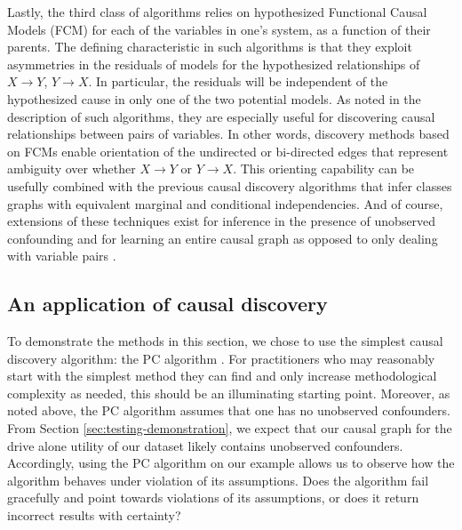Lastly, the third class of algorithms relies on hypothesized Functional Causal Models (FCM) \citep{goudet_2018_learning} for each of the variables in one's system, as a function of their parents.
The defining characteristic in such algorithms is that they exploit asymmetries in the residuals of models for the hypothesized relationships of $X \rightarrow Y$, $Y \rightarrow X$.
In particular, the residuals will be independent of the hypothesized cause in only one of the two potential models.
As noted in the description of such algorithms, they are especially useful for discovering causal relationships between pairs of variables.
In other words, discovery methods based on FCMs enable orientation of the undirected or bi-directed edges that represent ambiguity over whether $X \rightarrow Y$ or $Y \rightarrow X$.
This orienting capability can be usefully combined with the previous causal discovery algorithms that infer classes graphs with equivalent marginal and conditional independencies.
And of course, extensions of these techniques exist for inference in the presence of unobserved confounding \citep[Sec. 6]{goudet_2018_learning} and for learning an entire causal graph as opposed to only dealing with variable pairs \citep{zheng_2020_learning}.


\subsection{An application of causal discovery}
\label{sec:discovery-application}
To demonstrate the methods in this section, we chose to use the simplest causal discovery algorithm: the PC algorithm \citep{glymour_2001_causation}.
For practitioners who may reasonably start with the simplest method they can find and only increase methodological complexity as needed, this should be an illuminating starting point.
Moreover, as noted above, the PC algorithm assumes that one has no unobserved confounders.
From Section \ref{sec:testing-demonstration}, we expect that our causal graph for the drive alone utility of our dataset likely contains unobserved confounders.
Accordingly, using the PC algorithm on our example allows us to observe how the algorithm behaves under violation of its assumptions.
Does the algorithm fail gracefully and point towards violations of its assumptions, or does it return incorrect results with certainty?


